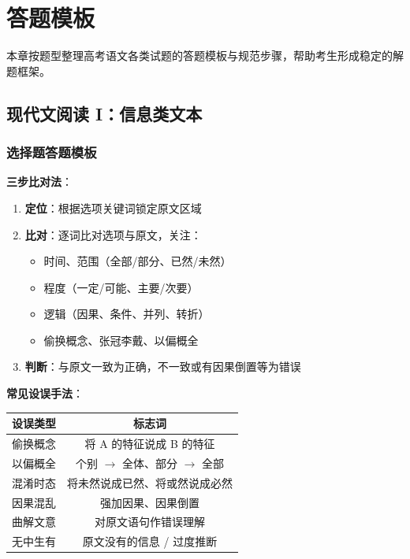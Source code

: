 \section{答题模板}

本章按题型整理高考语文各类试题的答题模板与规范步骤，帮助考生形成稳定的解题框架。

\subsection{现代文阅读 I：信息类文本}

\subsubsection{选择题答题模板}

\textbf{三步比对法}：

\begin{enumerate}
  \item \textbf{定位}：根据选项关键词锁定原文区域
  \item \textbf{比对}：逐词比对选项与原文，关注：
    \begin{itemize}
      \item 时间、范围（全部/部分、已然/未然）
      \item 程度（一定/可能、主要/次要）
      \item 逻辑（因果、条件、并列、转折）
      \item 偷换概念、张冠李戴、以偏概全
    \end{itemize}
  \item \textbf{判断}：与原文一致为正确，不一致或有因果倒置等为错误
\end{enumerate}

\textbf{常见设误手法}：

\begin{center}
\begin{tabular}{c|c}
\textbf{设误类型} & \textbf{标志词} \\ \hline
偷换概念 & 将 A 的特征说成 B 的特征 \\
以偏概全 & 个别 $\to$ 全体、部分 $\to$ 全部 \\
混淆时态 & 将未然说成已然、将或然说成必然 \\
因果混乱 & 强加因果、因果倒置 \\
曲解文意 & 对原文语句作错误理解 \\
无中生有 & 原文没有的信息 / 过度推断 \\
\end{tabular}
\end{center}

